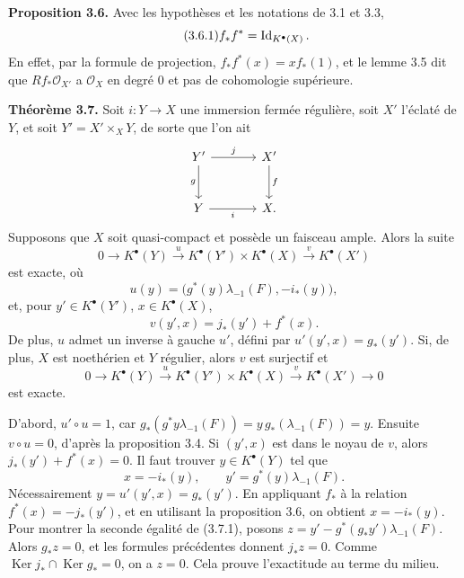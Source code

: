 \documentclass[11pt]{article}
\providecommand{\Ker}{\operatorname{Ker}}
\providecommand{\cO}{\mathcal O}
\begin{document}
\textbf{Proposition 3.6.} Avec les hypothèses et les notations de 3.1 et 3.3,
\begin{equation}\tag{3.6.1}
f_*f^*=\operatorname{Id}_{K^\bullet(X)}.
\end{equation}
En effet, par la formule de projection, \(f_*f^*(x)=xf_*(1)\), et le lemme 3.5 dit que \(Rf_*\cO_{X'}\) a \(\cO_X\) en degré \(0\) et pas de cohomologie supérieure.

\textbf{Théorème 3.7.} Soit \(i:Y\to X\) une immersion fermée régulière, soit \(X'\) l'éclaté de \(Y\), et soit \(Y'=X'\times_XY\), de sorte que l'on ait
\[
\begin{tikzcd}[column sep=large,row sep=large]
Y' \arrow[r,"j"] \arrow[d,"g"'] & X' \arrow[d,"f"]\\
Y \arrow[r,"i"'] & X.
\end{tikzcd}
\]
Supposons que \(X\) soit quasi-compact et possède un faisceau ample. Alors la suite
\begin{equation}\tag{3.7.0}
0\to K^\bullet(Y)\xrightarrow{u}K^\bullet(Y')\times K^\bullet(X)\xrightarrow{v}K^\bullet(X')
\end{equation}
est exacte, où
\begin{equation}\tag{3.7.u}
u(y)=\bigl(g^*(y)\lambda_{-1}(F),-i_*(y)\bigr),
\end{equation}
et, pour \(y'\in K^\bullet(Y')\), \(x\in K^\bullet(X)\),
\begin{equation}\tag{3.7.v}
v(y',x)=j_*(y')+f^*(x).
\end{equation}
De plus, \(u\) admet un inverse à gauche \(u'\), défini par \(u'(y',x)=g_*(y')\). Si, de plus, \(X\) est noethérien et \(Y\) régulier, alors \(v\) est surjectif et
\begin{equation}\tag{3.7.2}
0\to K^\bullet(Y)\xrightarrow{u}K^\bullet(Y')\times K^\bullet(X)\xrightarrow{v}K^\bullet(X')\to0
\end{equation}
est exacte.

D'abord, \(u'\circ u=1\), car \(g_*(g^*y\lambda_{-1}(F))=y\,g_*(\lambda_{-1}(F))=y\). Ensuite \(v\circ u=0\), d'après la proposition 3.4. Si \((y',x)\) est dans le noyau de \(v\), alors \(j_*(y')+f^*(x)=0\). Il faut trouver \(y\in K^\bullet(Y)\) tel que
\begin{equation}\tag{3.7.1}
x=-i_*(y),\qquad y'=g^*(y)\lambda_{-1}(F).
\end{equation}
Nécessairement \(y=u'(y',x)=g_*(y')\). En appliquant \(f_*\) à la relation \(f^*(x)=-j_*(y')\), et en utilisant la proposition 3.6, on obtient \(x=-i_*(y)\). Pour montrer la seconde égalité de (3.7.1), posons \(z=y'-g^*(g_*y')\lambda_{-1}(F)\). Alors \(g_*z=0\), et les formules précédentes donnent \(j_*z=0\). Comme \(\Ker j_*\cap\Ker g_*=0\), on a \(z=0\). Cela prouve l'exactitude au terme du milieu.
\end{document}

